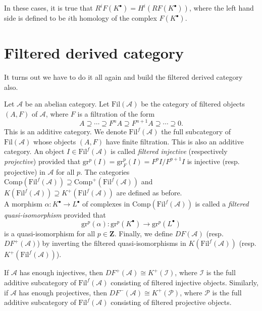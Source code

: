 \begin{remark}
\label{remark-cohomology-of-derived-functor}
In these cases, it is true that $R^iF(K^\bullet) = H^i(RF(K^\bullet))$, where
the left hand side is defined to be $i$th homology of the complex
$F(K^\bullet)$.
\end{remark}




\section{Filtered derived category}
\label{section-filtered-derived-category}

\noindent
It turns out we have to do it all again and build the filtered derived
category also.

\begin{definition}
\label{definition-filtered}
Let $\mathcal{A}$ be an abelian category. Let $\text{Fil}(\mathcal{A})$ be the
category of filtered objects $(A, F)$ of $\mathcal{A}$, where $F$ is a
filtration of the form
$$
A \supseteq \cdots \supseteq F^n A \supseteq F^{n+1}A \supseteq \cdots
\supseteq 0.
$$
This is an additive category. We denote $\text{Fil}^f(\mathcal{A})$ the full
subcategory of $\text{Fil}(\mathcal{A})$ whose objects $(A, F)$ have finite
filtration. This is also an additive category. An object $I \in
\text{Fil}^f(\mathcal{A})$ is called {\it filtered injective} (respectively
{\it projective}) provided that $\text{gr}^p(I) = \text{gr}_F^p(I) =
F^pI/F^{p+1}I$ is injective (resp. projective) in $\mathcal{A}$ for all $p$.
The categories $\text{Comp}(\text{Fil}^f(\mathcal{A})) \supseteq
\text{Comp}^+(\text{Fil}^f(\mathcal{A}))$ and $K(\text{Fil}^f(\mathcal{A}))
\supseteq K^+(\text{Fil}^f(\mathcal A))$ are defined as before.
\\
A morphism $\alpha : K^\bullet \to L^\bullet$ of complexes in
$\text{Comp}(\text{Fil}^f(\mathcal{A}))$ is called a {\it filtered
quasi-isomorphism} provided that
$$
\mathrm{gr}^p(\alpha): \mathrm{gr}^p(K^\bullet) \to \mathrm{gr}^p(L^\bullet)
$$
is a quasi-isomorphism for all $p \in \mathbf{Z}$. Finally, we define $D
F(\mathcal{A})$ (resp. $D F^+(\mathcal{A})$) by inverting the filtered
quasi-isomorphisms in $K(\text{Fil}^f(\mathcal{A}))$ (resp.
$K^+(\text{Fil}^f(\mathcal{A}))$).
\end{definition}

\begin{lemma}
\label{lemma-filtered-derived-category}
If $\mathcal{A}$ has enough injectives, then $D F^+(\mathcal{A}) \cong
K^+(\mathcal{I})$, where $\mathcal{I}$ is the full additive subcategory of
$\text{Fil}^f(\mathcal{A})$ consisting of filtered injective objects.
Similarly, if $\mathcal{A}$ has enough projectives, then $D F^-(\mathcal{A})
\cong K^+(\mathcal{P})$, where $\mathcal P$ is the full additive subcategory of
$\text{Fil}^f(\mathcal{A})$ consisting of filtered projective objects.
\end{lemma}

